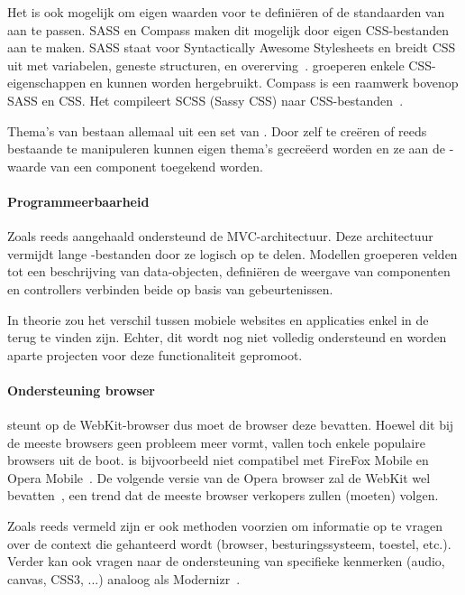 Het is ook mogelijk om eigen waarden voor  te definiëren of de standaarden van \st{} aan te passen.  
SASS en Compass maken dit mogelijk door eigen CSS-bestanden aan te maken.  
SASS staat voor Syntactically Awesome Stylesheets en breidt CSS uit met variabelen,  geneste structuren,  en overerving~\cite{Eppstein2013}.  
 groeperen enkele CSS-eigenschappen en kunnen worden hergebruikt.  
Compass is een raamwerk bovenop SASS en CSS.  
Het compileert SCSS (Sassy CSS) naar CSS-bestanden~\cite{Eppstein2013a}.        

Thema's van \st{} bestaan allemaal uit een set van .  
Door zelf  te creëren of reeds bestaande te manipuleren kunnen eigen thema's gecreëerd worden en ze aan de -waarde van een component toegekend worden.

\paragraph{Programmeerbaarheid}
\label{sec:sencha-programeerbaarheid}
Zoals reeds aangehaald ondersteund \st{} de MVC-architectuur.  
Deze architectuur vermijdt lange \js{}-bestanden door ze logisch op te delen.  
Modellen groeperen velden tot een beschrijving van data-objecten,  definiëren de weergave van componenten en controllers verbinden beide op basis van gebeurtenissen.

In theorie zou het verschil tussen mobiele websites en applicaties enkel in de  terug te vinden zijn.  
Echter,  dit wordt nog niet volledig ondersteund en worden aparte projecten voor deze functionaliteit gepromoot.

\paragraph{Ondersteuning browser}
\st{} steunt op de WebKit-browser  dus moet de browser deze bevatten.  
Hoewel dit bij de meeste browsers geen probleem meer vormt, vallen toch enkele populaire browsers uit de boot.  
\st{} is bijvoorbeeld niet compatibel met FireFox Mobile en Opera Mobile~\cite{JohnEClark2012}.
De volgende versie van de Opera browser zal de WebKit  wel bevatten~\cite{Wokke2013}, een trend dat de meeste browser verkopers zullen (moeten) volgen.

Zoals reeds vermeld zijn er ook methoden voorzien om informatie op te vragen over de context die gehanteerd wordt (browser, besturingssysteem, toestel, etc.).  
Verder kan \st{} ook vragen naar de ondersteuning van specifieke kenmerken (audio,  canvas,  CSS3, ...)  analoog als Modernizr~\cite{Modernizr2012}.  

